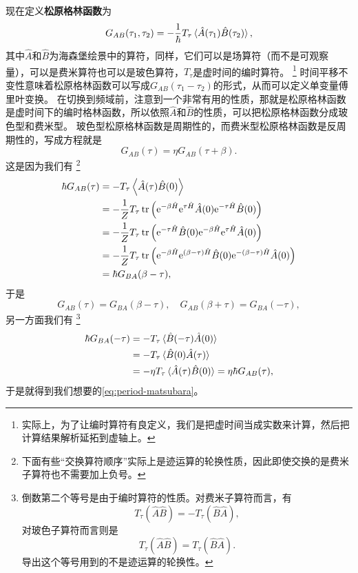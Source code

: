\documentclass[hyperref, UTF8, a4paper]{ctexart}
\newcommand*{\ee}{\mathrm{e}}
\begin{document}
现在定义\textbf{松原格林函数}为
\begin{equation}
    G_{AB}(\tau_1, \tau_2) = - \frac{1}{\hbar} T_\tau \expval*{\hat{A}(\tau_1)\hat{B}(\tau_2)},
\end{equation}
其中$\hat{A}$和$\hat{B}$为海森堡绘景中的算符，同样，它们可以是场算符（而不是可观察量），可以是费米算符也可以是玻色算符，$T_\tau$是虚时间的编时算符。%
\footnote{实际上，为了让编时算符有良定义，我们是把虚时间当成实数来计算，然后把计算结果解析延拓到虚轴上。}%
时间平移不变性意味着松原格林函数可以写成$G_{AB}(\tau_1-\tau_2)$的形式，从而可以定义单变量傅里叶变换。
在切换到频域前，注意到一个非常有用的性质，那就是松原格林函数是虚时间下的编时格林函数，所以依照$\hat{A}$和$\hat{B}$的性质，可以把松原格林函数分成玻色型和费米型。
玻色型松原格林函数是周期性的，而费米型松原格林函数是反周期性的，写成方程就是
\begin{equation}
    G_{AB}(\tau) = \eta G_{AB}(\tau+\beta).
    \label{eq:period-matsubara}
\end{equation}
这是因为我们有%
\footnote{下面有些“交换算符顺序”实际上是迹运算的轮换性质，因此即使交换的是费米子算符也不需要加上负号。}%
\[
    \begin{aligned}
        \hbar G_{AB}(\tau) &= - T_\tau \expval{\hat{A}(\tau)\hat{B}(0)} \\
        &= - \frac{1}{Z} T_\tau \trace \left( \ee^{-\beta \hat{H}} \ee^{\tau \hat{H}} \hat{A}(0) \ee^{ - \tau \hat{H}} \hat{B}(0) \right) \\
        &= - \frac{1}{Z} T_\tau \trace \left(  \ee^{ - \tau \hat{H}} \hat{B}(0) \ee^{-\beta \hat{H}} \ee^{\tau \hat{H}} \hat{A}(0) \right) \\
        &= - \frac{1}{Z} T_\tau \trace \left( \ee^{-\beta \hat{H}} \ee^{(\beta-\tau) \hat{H}} \hat{B}(0) \ee^{-(\beta-\tau)\hat{H}} \hat{A}(0) \right) \\
        &= \hbar G_{BA} (\beta - \tau),
    \end{aligned}
\]
于是
\begin{equation}
    G_{AB}(\tau) = G_{BA} (\beta - \tau), \quad G_{AB}(\beta+\tau) = G_{BA}(-\tau),
\end{equation}
另一方面我们有%
\footnote{倒数第二个等号是由于编时算符的性质。对费米子算符而言，有
\[
    T_\tau (\hat{A} \hat{B}) = - T_\tau (\hat{B} \hat{A}),
\]
对玻色子算符而言则是
\[
    T_\tau (\hat{A} \hat{B}) = T_\tau (\hat{B} \hat{A}).
\]
导出这个等号用到的不是迹运算的轮换性。
}
\[
    \begin{aligned}
        \hbar G_{BA}(-\tau) &= - T_\tau  \expval*{\hat{B}(-\tau)\hat{A}(0)} \\
        &= - T_\tau \expval*{\hat{B}(0)\hat{A}(\tau)} \\
        &= - \eta T_\tau \expval*{\hat{A}(\tau)\hat{B}(0)} = \eta \hbar G_{AB}(\tau),
    \end{aligned}
\]
于是就得到我们想要的\eqref{eq:period-matsubara}。
\end{document}
